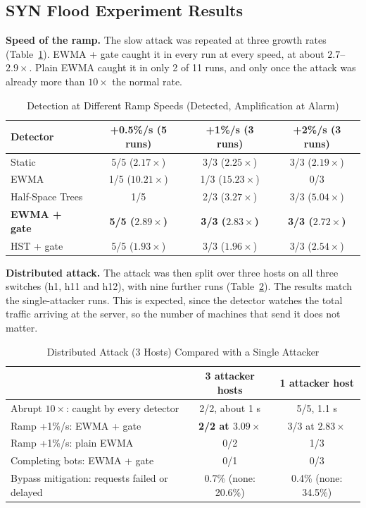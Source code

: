 \documentclass[12pt,a4paper]{article}
\begin{document}
\subsection{SYN Flood Experiment Results}
\textbf{Speed of the ramp.} The slow attack was repeated at three growth rates
(Table~\ref{tab:growth}). EWMA + gate caught it in every run at every speed, at
about $2.7$--$2.9\times$. Plain EWMA caught it in only 2 of 11 runs, and only
once the attack was already more than $10\times$ the normal rate.

\begin{table}[H]
\centering
\caption{Detection at Different Ramp Speeds (Detected, Amplification at Alarm)}
\label{tab:growth}
\small
\begin{tabular}{lccc}
\toprule
Detector & +0.5\%/s (5 runs) & +1\%/s (3 runs) & +2\%/s (3 runs) \\
\midrule
Static           & 5/5 ($2.17\times$) & 3/3 ($2.25\times$) & 3/3 ($2.19\times$) \\
EWMA             & 1/5 ($10.21\times$) & 1/3 ($15.23\times$) & 0/3 \\
Half-Space Trees & 1/5 & 2/3 ($3.27\times$) & 3/3 ($5.04\times$) \\
\textbf{EWMA + gate} & \textbf{5/5 ($2.89\times$)} & \textbf{3/3 ($2.83\times$)} & \textbf{3/3 ($2.72\times$)} \\
HST + gate       & 5/5 ($1.93\times$) & 3/3 ($1.96\times$) & 3/3 ($2.54\times$) \\
\bottomrule
\end{tabular}
\end{table}

\textbf{Distributed attack.} The attack was then split over three hosts on all
three switches (h1, h11 and h12), with nine further runs
(Table~\ref{tab:distributed}). The results match the single-attacker runs. This
is expected, since the detector watches the total traffic arriving at the
server, so the number of machines that send it does not matter.

\begin{table}[H]
\centering
\caption{Distributed Attack (3 Hosts) Compared with a Single Attacker}
\label{tab:distributed}
\small
\begin{tabular}{lcc}
\toprule
& 3 attacker hosts & 1 attacker host \\
\midrule
Abrupt $10\times$: caught by every detector & 2/2, about 1 s & 5/5, 1.1 s \\
Ramp +1\%/s: EWMA + gate & \textbf{2/2 at $3.09\times$} & 3/3 at $2.83\times$ \\
Ramp +1\%/s: plain EWMA  & 0/2 & 1/3 \\
Completing bots: EWMA + gate & 0/1 & 0/3 \\
Bypass mitigation: requests failed or delayed & 0.7\% (none: 20.6\%) & 0.4\% (none: 34.5\%) \\
\bottomrule
\end{tabular}
\end{table}
\end{document}
